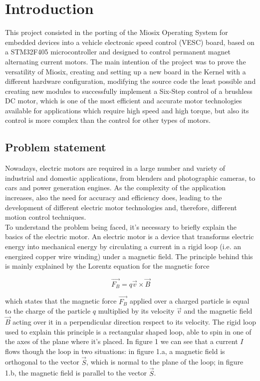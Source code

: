 \section{Introduction}
This project consisted in the porting of the Miosix Operating System for embedded devices into a vehicle electronic speed control (VESC) board, based on a STM32F405 microcontroller and designed to control permanent magnet alternating current motors. The main intention of the project was to prove the versatility of Miosix, creating and setting up a new board in the Kernel with a different hardware configuration, modifying the source code the least possible and creating new modules to successfully implement a Six-Step control of a brushless DC motor, which is one of the most efficient and accurate motor technologies available for applications which require high speed and high torque, but also its control is more complex than the control for other types of motors.


\subsection{Problem statement}
Nowadays, electric motors are required in a large number and variety of industrial and domestic applications, from blenders and photographic cameras, to cars and power generation engines. As the complexity of the application increases, also the need for accuracy and efficiency does, leading to the development of different electric motor technologies and, therefore, different motion control techniques.\\

To understand the problem being faced, it's necessary to briefly explain the basics of the electric motor. An electric motor is a device that transforms electric energy into mechanical energy by circulating a current in a rigid loop (i.e. an energized copper wire winding) under a magnetic field. The principle behind this is mainly explained by the Lorentz equation for the magnetic force

\begin{equation}
\overrightarrow{F_{B}}=q\overrightarrow{v}\times\overrightarrow{B}
\end{equation}

which states that the magnetic force $\overrightarrow{F_{B}}$ applied over a charged particle is equal to the charge of the particle $q$ multiplied by its velocity $\overrightarrow{v}$ and the magnetic field $\overrightarrow{B}$ acting over it in a perpendicular direction respect to its velocity. The rigid loop used to explain this principle is a rectangular shaped loop, able to spin in one of the axes of the plane where it's placed. In figure 1 we can see that a current $I$ flows though the loop in two situations: in figure 1.a, a magnetic field is orthogonal to the vector $\overrightarrow{S}$, which is normal to the plane of the loop; in figure 1.b, the magnetic field is parallel to the vector $\overrightarrow{S}$. \\

